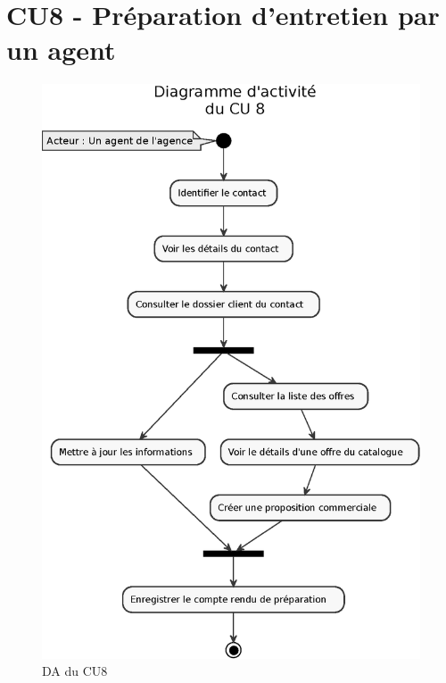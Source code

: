 \clearpage
\section{CU8 - Préparation d’entretien par un agent}

\begin{figure}[H]
\centering
\includegraphics[width=\textwidth]{figures/eps/DA_CU8.eps}
\caption{DA du CU8}
\end{figure}

